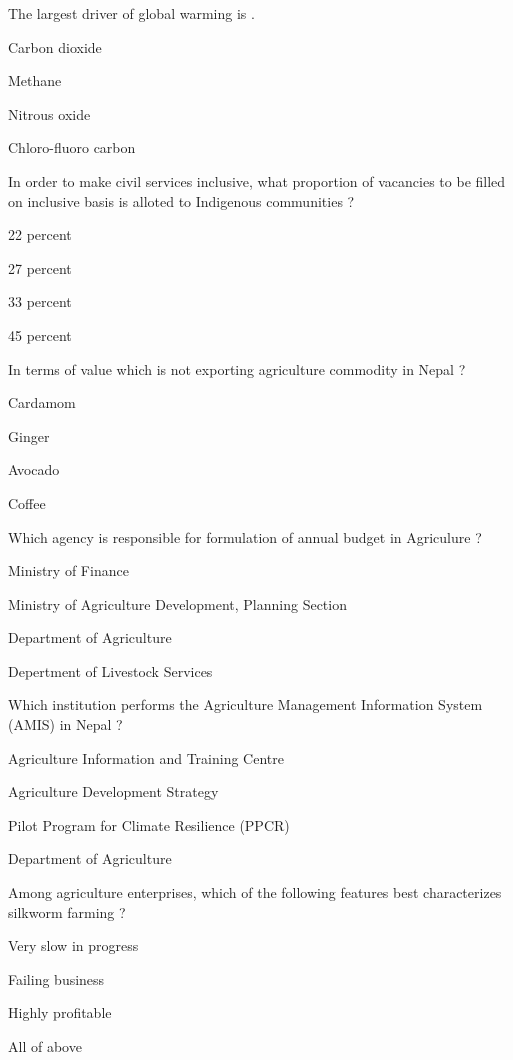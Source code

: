 \begin{questions}
\question The largest driver of global warming is \fillin[][3cm].
\begin{items}
\item* Carbon dioxide
\item Methane
\item Nitrous oxide
\item Chloro-fluoro carbon
\end{items}

\question In order to make civil services inclusive, what proportion of vacancies to be filled on inclusive basis is alloted to Indigenous communities ?
\begin{items}
\item 22 percent
\item* 27 percent
\item 33 percent
\item 45 percent
\end{items}

\question In terms of value which is not exporting agriculture commodity in Nepal ?
\begin{items}
\item Cardamom
\item Ginger
\item* Avocado
\item Coffee
\end{items}

\question Which agency is responsible for formulation of annual budget in Agriculure ?
\begin{items}
\item* Ministry of Finance
\item Ministry of Agriculture Development, Planning Section
\item Department of Agriculture
\item Depertment of Livestock Services
\end{items}

\question Which institution performs the Agriculture Management Information System (AMIS) in Nepal ?
\begin{items}
\item Agriculture Information and Training Centre
\item Agriculture Development Strategy
\item* Pilot Program for Climate Resilience (PPCR)
\item Department of Agriculture
\end{items}

\question Among agriculture enterprises, which of the following features best characterizes silkworm farming ?
\begin{items}
\item Very slow in progress
\item Failing business
\item* Highly profitable
\item All of above
\end{items}


\end{questions}

